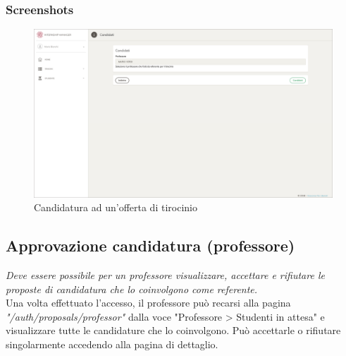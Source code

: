 \subsubsection{Screenshots}
\begin{figure}[H]
	\centering
	\includegraphics[width=1\textwidth]{Figs/screenshots/internshipcandidate}     
	\caption[Screenshot: candidatura ad un'offerta di tirocinio]{Candidatura ad un'offerta di tirocinio}
	\label{fig:screenshot:4}
\end{figure}

\pagebreak
\subsection{Approvazione candidatura (professore)}

\textit{Deve essere possibile per un professore visualizzare, accettare e rifiutare le proposte di candidatura che lo coinvolgono come referente.} \\

\noindent
Una volta effettuato l'accesso, il professore può recarsi alla pagina \textit{"/auth/proposals/professor"} dalla voce "Professore > Studenti in attesa" e visualizzare tutte le candidature che lo coinvolgono. Può accettarle o rifiutare singolarmente accedendo alla pagina di dettaglio.

